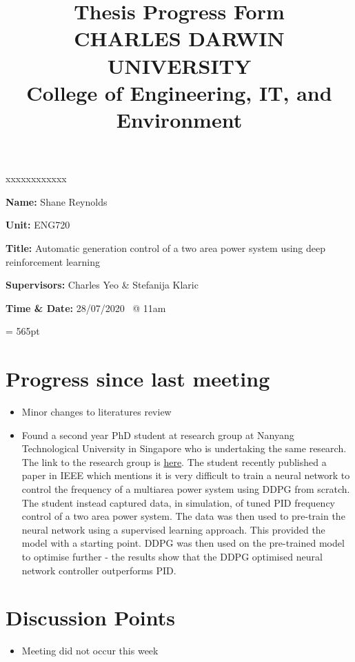 \documentclass[12pt]{article}
\title{	
		Thesis Progress Form\\
		CHARLES DARWIN UNIVERSITY\\
		College of Engineering, IT, and Environment
	  }
\author{}
\date{}
\begin{document}
	
	\maketitle
	
	\begin{namelist}{xxxxxxxxxxxx}
		\item[{\bf Name:}]
			Shane Reynolds
		\item[{\bf Unit:}]
			ENG720
		\item[{\bf Title:}]
			Automatic generation control of a two area power system using deep reinforcement learning
		\item[{\bf Supervisors:}]
			Charles Yeo \& Stefanija Klaric
		\item[{\bf Time \& Date:} 28/07/2020 \ @ 11am]
			
	\end{namelist}
	
	\pagestyle{plain} %
	\textheight = 565pt %
	
	\section{Progress since last meeting}
	\begin{itemize}
		\item Minor changes to literatures review
		\item Found a second year PhD student at research group at Nanyang Technological University in Singapore who is undertaking the same research. The link to the research group is \href{https://eexuyan.github.io/soda/index.html}{here}. The student recently published a paper in IEEE which mentions it is very difficult to train a neural network to control the frequency of a multiarea power system using DDPG from scratch. The student instead captured data, in simulation, of tuned PID frequency control of a two area power system. The data was then used to pre-train the neural network using a supervised learning approach. This provided the model with a starting point. DDPG was then used on the pre-trained model to optimise further - the results show that the DDPG optimised neural network controller outperforms PID.
	\end{itemize}
	\section{Discussion Points}
	\begin{itemize}
		\item Meeting did not occur this week
	\end{itemize}
\end{document}

